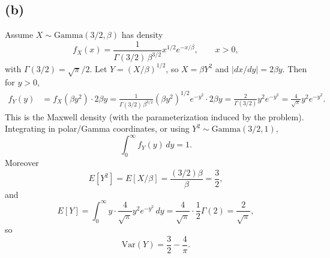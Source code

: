 \documentclass[11pt]{article}
\begin{document}
\subsection*{(b)}

Assume $X\sim\mathrm{Gamma}(3/2,\beta)$ has density
\[
f_X(x)=\frac{1}{\Gamma(3/2)\,\beta^{3/2}}x^{1/2}e^{-x/\beta},\qquad x>0,
\]
with $\Gamma(3/2)=\sqrt{\pi}/2$. Let $Y=(X/\beta)^{1/2}$, so $X=\beta Y^2$ and $|dx/dy|=2\beta y$. Then for $y>0$,
\begin{align*}
f_Y(y)
&=f_X(\beta y^2)\cdot 2\beta y
=\frac{1}{\Gamma(3/2)\,\beta^{3/2}}(\beta y^2)^{1/2}e^{-y^2}\cdot 2\beta y
=\frac{2}{\Gamma(3/2)}y^2 e^{-y^2}
=\frac{4}{\sqrt{\pi}}y^2 e^{-y^2}.
\end{align*}
This is the Maxwell density (with the parameterization induced by the problem). Integrating in polar/Gamma coordinates, or using $Y^2\sim\mathrm{Gamma}(3/2,1)$,
\[
\int_0^\infty f_Y(y)\,dy=1.
\]
Moreover
\[
E[Y^2]=E[X/\beta]=\frac{(3/2)\beta}{\beta}=\frac32,
\]
and
\[
E[Y]=\int_0^\infty y\cdot\frac{4}{\sqrt{\pi}}y^2 e^{-y^2}\,dy=\frac{4}{\sqrt{\pi}}\cdot\frac12\Gamma(2)=\frac{2}{\sqrt{\pi}},
\]
so
\[
\mathrm{Var}(Y)=\frac32-\frac{4}{\pi}.
\]
\end{document}
